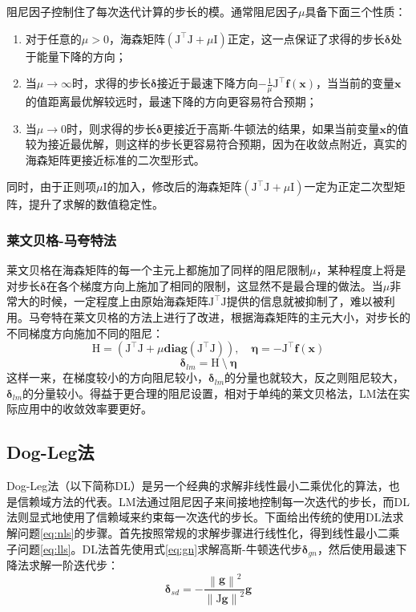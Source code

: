 阻尼因子控制住了每次迭代计算的步长的模。通常阻尼因子$\mu$具备下面三个性质\citep{tingleff2004methods}：
\begin{enumerate}
    \item 对于任意的$\mu>0$，海森矩阵$(\mathrm{J}^\top\mathrm{J}+\mu\mathrm{I})$正定，这一点保证了求得的步长$\bm{\delta}$处于能量下降的方向；
    \item 当$\mu\to\infty$时，求得的步长$\bm{\delta}$接近于最速下降方向$-\frac{1}{\mu}\mathrm{J}^\top\bm{f}(\bm{x})$，当当前的变量$\bm{x}$ 的值距离最优解较远时，最速下降的方向更容易符合预期；
    \item 当$\mu\to0$时，则求得的步长$\bm{\delta}$更接近于高斯-牛顿法的结果，如果当前变量$\bm{x}$的值较为接近最优解，则这样的步长更容易符合预期，因为在收敛点附近，真实的海森矩阵更接近标准的二次型形式。
\end{enumerate}
同时，由于正则项$\mu\mathrm{I}$的加入，修改后的海森矩阵$(\mathrm{J}^\top\mathrm{J}+\mu\mathrm{I})$一定为正定二次型矩阵，提升了求解的数值稳定性。

\subsubsection*{莱文贝格-马夸特法}

莱文贝格在海森矩阵的每一个主元上都施加了同样的阻尼限制$\mu$，某种程度上将是对步长$\bm{\delta}$在各个梯度方向上施加了相同的限制，这显然不是最合理的做法。当$\mu$非常大的时候，一定程度上由原始海森矩阵$\mathrm{J}^\top\mathrm{J}$提供的信息就被抑制了，难以被利用。马夸特在莱文贝格的方法上进行了改进，根据海森矩阵的主元大小，对步长的不同梯度方向施加不同的阻尼：
\begin{equation}
    \mathrm{H} = \left( \mathrm{J}^\top\mathrm{J}+\mu\mathbf{diag}(\mathrm{J}^\top\mathrm{J}) \right), \quad
    \bm{\eta}  = -\mathrm{J}^\top\bm{f}(\bm{x})
\end{equation}
\begin{equation}
    \bm{\delta}_{lm} = \mathrm{H} \:\setminus\: \bm{\eta}
    \label{eq:lm}
\end{equation}
这样一来，在梯度较小的方向阻尼较小，$\bm{\delta}_{lm}$的分量也就较大，反之则阻尼较大，$\bm{\delta}_{lm}$的分量较小。得益于更合理的阻尼设置，相对于单纯的莱文贝格法，LM法在实际应用中的收敛效率要更好。

\subsection{Dog-Leg法}

Dog-Leg法（以下简称DL）是另一个经典的求解非线性最小二乘优化的算法，也是信赖域方法的代表。LM法通过阻尼因子来间接地控制每一次迭代的步长，而DL法则显式地使用了信赖域来约束每一次迭代的步长。下面给出传统的使用DL法求解问题\eqref{eq:nls}的步骤\citep{tingleff2004methods}。首先按照常规的求解步骤进行线性化，得到线性最小二乘子问题\eqref{eq:lls}。DL法首先使用式\eqref{eq:gn}求解高斯-牛顿迭代步$\bm{\delta}_{gn}$，然后使用最速下降法求解一阶迭代步：
\begin{equation}
    \bm{\delta}_{sd} = -\frac{\left\|\bm{g}\right\|^2}
                             {\left\|\mathrm{J}\bm{g}\right\|^2} \bm{g}
    \label{eq:sd}
\end{equation}

